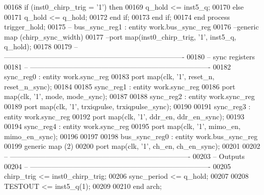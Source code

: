 \begin{DoxyCode}
00168         \textcolor{keywordflow}{if} \textcolor{vhdlchar}{(}\textcolor{vhdlchar}{inst0_chirp_trig} \textcolor{vhdlchar}{=} \textcolor{vhdlchar}{'}\textcolor{vhdllogic}{}\textcolor{vhdllogic}{1}\textcolor{vhdlchar}{'}\textcolor{vhdlchar}{)} \textcolor{keywordflow}{then}
00169         \textcolor{vhdlchar}{q_hold} \textcolor{vhdlchar}{<=} \textcolor{vhdlchar}{inst5_q};
00170         \textcolor{keywordflow}{else}
00171         \textcolor{vhdlchar}{q_hold} \textcolor{vhdlchar}{<=} \textcolor{vhdlchar}{q_hold};
00172         \textcolor{keywordflow}{end} \textcolor{keywordflow}{if};
00173  \textcolor{keywordflow}{end} \textcolor{keywordflow}{if};
00174 \textcolor{keywordflow}{end} \textcolor{keywordflow}{process} \textcolor{vhdlchar}{trigger\_hold};
00175 \textcolor{keyword}{-- bus\_sync\_reg1 : entity work.bus\_sync\_reg}
00176 \textcolor{keyword}{--generic map (chirp\_sync\_width)}
00177 \textcolor{keyword}{--port map(inst0\_chirp\_trig, '1', inst5\_q, q\_hold);}
00178         
00179 \textcolor{keyword}{-- ----------------------------------------------------------------------------}
00180 \textcolor{keyword}{-- sync registers}
00181 \textcolor{keyword}{-- ----------------------------------------------------------------------------}
00182 sync\_reg0 : \textcolor{keywordflow}{entity} work.sync_reg 
00183 \textcolor{keywordflow}{port} \textcolor{keywordflow}{map}(clk, '1', reset_n, reset_n_sync\textcolor{vhdlchar}{)};
00184 
00185 sync\_reg1 : \textcolor{keywordflow}{entity} work.sync_reg 
00186 \textcolor{keywordflow}{port} \textcolor{keywordflow}{map}(clk, '1', mode, mode_sync\textcolor{vhdlchar}{)};
00187 
00188 sync\_reg2 : \textcolor{keywordflow}{entity} work.sync_reg 
00189 \textcolor{keywordflow}{port} \textcolor{keywordflow}{map}(clk, '1', trxiqpulse, trxiqpulse_sync\textcolor{vhdlchar}{)};
00190 
00191 sync\_reg3 : \textcolor{keywordflow}{entity} work.sync_reg 
00192 \textcolor{keywordflow}{port} \textcolor{keywordflow}{map}(clk, '1', ddr_en, ddr_en_sync\textcolor{vhdlchar}{)};
00193 
00194 sync\_reg4 : \textcolor{keywordflow}{entity} work.sync_reg 
00195 \textcolor{keywordflow}{port} \textcolor{keywordflow}{map}(clk, '1', mimo_en, mimo_en_sync\textcolor{vhdlchar}{)};
00196 
00197 
00198 bus\_sync\_reg0 : \textcolor{keywordflow}{entity} work.bus_sync_reg
00199 \textcolor{keywordflow}{generic} \textcolor{keywordflow}{map} (\textcolor{vhdllogic}{2}\textcolor{vhdlchar}{)}
00200 \textcolor{keywordflow}{port} \textcolor{keywordflow}{map}(clk, '1', ch_en, ch_en_sync\textcolor{vhdlchar}{)};
00201         
00202 \textcolor{keyword}{-- ----------------------------------------------------------------------------}
00203 \textcolor{keyword}{-- Outputs}
00204 \textcolor{keyword}{-- ----------------------------------------------------------------------------}
00205 \textcolor{vhdlchar}{chirp_trig} \textcolor{vhdlchar}{<=} \textcolor{vhdlchar}{inst0_chirp_trig};
00206 \textcolor{vhdlchar}{sync_period} \textcolor{vhdlchar}{<=} \textcolor{vhdlchar}{q_hold};
00207 
00208 \textcolor{vhdlchar}{TESTOUT} \textcolor{vhdlchar}{<=} \textcolor{vhdlchar}{inst5_q}\textcolor{vhdlchar}{(}\textcolor{vhdllogic}{}\textcolor{vhdllogic}{1}\textcolor{vhdlchar}{)};
00209 
00210 \textcolor{keywordflow}{end} \textcolor{vhdlchar}{arch};   
\end{DoxyCode}
